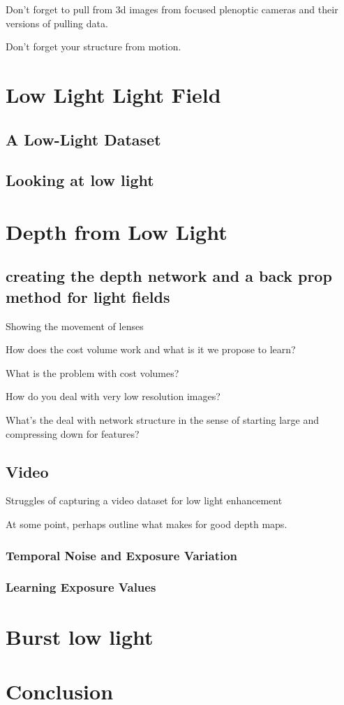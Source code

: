 \documentclass[12pt]{report}
\begin{document}
Don't forget to pull from 3d images from focused plenoptic cameras and their versions of pulling data.

Don't forget your structure from motion.

\chapter{Low Light Light Field}
\section{A Low-Light Dataset}

\section{Looking at low light}

\chapter{Depth from Low Light}
\section{creating the depth network and a back prop method for light fields}
Showing the movement of lenses

How does the cost volume work and what is it we propose to learn?

What is the problem with cost volumes?

How do you deal with very low resolution images?

What's the deal with network structure in the sense of starting large and compressing down for features?
\section{Video}
Struggles of capturing a video dataset for low light enhancement

At some point, perhaps outline what makes for good depth maps.

\subsection{Temporal Noise and Exposure Variation}
\subsection{Learning Exposure Values}

\chapter{Burst low light}

\chapter{Conclusion}
\end{document}
